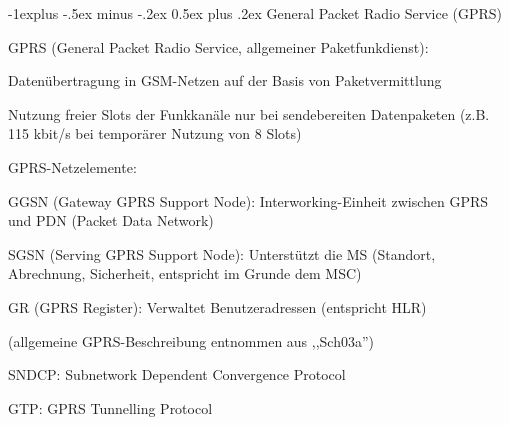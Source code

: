 \documentclass[a4paper]{article}
\makeatletter
\renewcommand{\subsection}{\@startsection{subsection}{2}{0mm}%
 {-1explus -.5ex minus -.2ex}%
 {0.5ex plus .2ex}%
 {\normalfont\normalsize\bfseries}}
\makeatother
\begin{document}
\begin{multicols}{3}
      \subsection{General Packet Radio Service
            (GPRS)}

      \begin{itemize*}
            \item GPRS (General Packet Radio Service, allgemeiner Paketfunkdienst):
            \begin{itemize*}
                  \item Datenübertragung in GSM-Netzen auf der Basis von Paketvermittlung
                  \item Nutzung freier Slots der Funkkanäle nur bei sendebereiten Datenpaketen (z.B. 115 kbit/s bei temporärer Nutzung von 8 Slots)
            \end{itemize*}
            \item GPRS-Netzelemente:
            \begin{itemize*}
                  \item GGSN (Gateway GPRS Support Node): Interworking-Einheit zwischen GPRS und PDN (Packet Data Network)
                  \item SGSN (Serving GPRS Support Node): Unterstützt die MS (Standort, Abrechnung, Sicherheit, entspricht im Grunde dem MSC)
                  \item GR (GPRS Register): Verwaltet Benutzeradressen (entspricht HLR)
            \end{itemize*}
      \end{itemize*}

      (allgemeine GPRS-Beschreibung entnommen aus ,,Sch03a'')



      \begin{itemize*}
            \item SNDCP: Subnetwork Dependent Convergence Protocol
            \item GTP: GPRS Tunnelling Protocol
      \end{itemize*}


\end{multicols}
\end{document}

